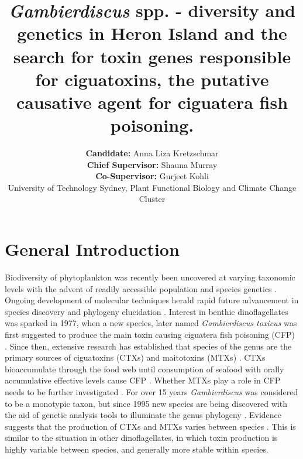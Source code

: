 \documentclass[12pt]{article}
\title{\textbf{ \emph{Gambierdiscus} spp. -  diversity and genetics in Heron Island and the search for toxin genes responsible for ciguatoxins, the putative causative agent for ciguatera fish poisoning.}}
\author{\textbf{Candidate:} Anna Liza Kretzschmar\\
 \textbf{Chief Supervisor:} Shauna Murray\\
 \textbf{Co-Supervisor:} Gurjeet Kohli\\
 {\small University of Technology Sydney, Plant Functional Biology and Climate Change Cluster}}
\date{}
\begin{document}
\maketitle
\section{General Introduction}
Biodiversity of phytoplankton was recently been uncovered at varying taxonomic levels with the advent of readily accessible population and species genetics \cite{simon2009diversity}. Ongoing development of molecular techniques herald rapid future advancement in species discovery and phylogeny elucidation \cite{murray2012genetic,murray2012transcriptomics}.
Interest in benthic dinoflagellates was sparked in 1977, when a new species, later named \emph{Gambierdiscus toxicus} was first suggested to produce the main toxin causing ciguatera fish poisoning (CFP) \cite{yasumoto1977finding}.  
Since then, extensive research has established that species of the genus are the primary sources of ciguatoxins (CTXs) and maitotoxins (MTXs) \cite{chinain1997intraspecific,holmes1998gambierdiscus}. CTXs bioaccumulate through the food web until consumption of seafood with orally accumulative effective levels cause CFP \cite{bagnis1979clinical,gillespie1987possible,sims1987theoretical}. Whether MTXs play a role in CFP needs to be further investigated \cite{kohli2014feeding}. For over 15 years \emph{Gambierdiscus} was considered to be a monotypic taxon, but since 1995 new species are being discovered with the aid of genetic analysis tools to illuminate the genus phylogeny \cite{faust1995observation,holmes1998gambierdiscus,litaker2009taxonomy,chinain1999morphology,fraga2011gambierdiscus,nishimura2014morphology}. Evidence suggests that the production of CTXs and MTXs varies between species \cite{chinain2010growth,holland2013differences}. This is similar to the situation in other dinoflagellates, in which toxin production is highly variable between species, and generally more stable within species.
\end{document}
